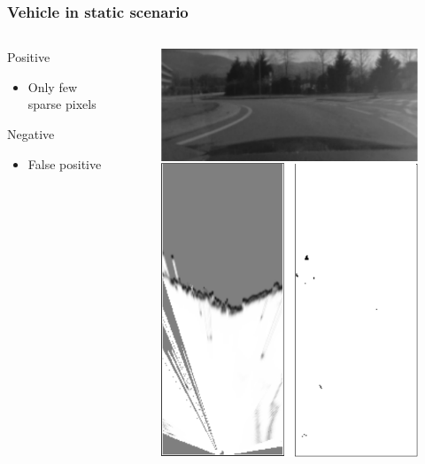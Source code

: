 \documentclass{beamer}
\begin{document}
	\begin{frame}
		\frametitle{Vehicle in static scenario}
		
		\begin{columns}[t]
			\begin{column}[t]{5cm}
				\begin{exampleblock}{Positive}
				\begin{itemize}
				\item Only few sparse pixels
				\end{itemize}
				\end{exampleblock}
								
				\begin{alertblock}{Negative}
				\begin{itemize}
				\item False positive
				\end{itemize}
				\end{alertblock}			
			\end{column}
			\begin{column}[t]{5cm}
				\begin{figure}[h]
				\center
				\includegraphics[scale=0.55]{../img/fig:result:scenestatic}
				\end{figure}
			\end{column}
		\end{columns}
	\end{frame}			
\end{document}
